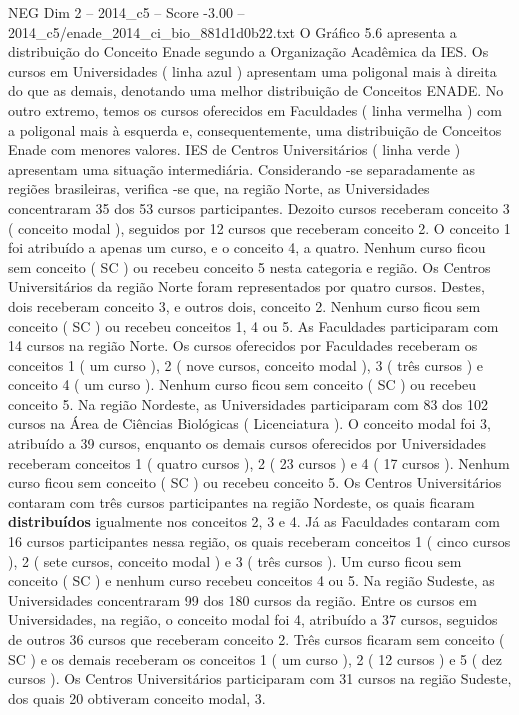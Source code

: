 \begin{textsample}{NEG Dim 2 – 2014\_c5 – Score -3.00 – 2014\_c5/enade\_2014\_ci\_bio\_881d1d0b22.txt}
O Gráfico 5.6 apresenta a distribuição do Conceito Enade segundo a Organização Acadêmica da IES.
Os cursos em Universidades ( linha azul ) apresentam uma poligonal mais à direita do que as demais, denotando uma melhor distribuição de Conceitos ENADE.
No outro extremo, temos os cursos oferecidos em Faculdades ( linha vermelha ) com a poligonal mais à esquerda e, consequentemente, uma distribuição de Conceitos Enade com menores valores.
IES de Centros Universitários ( linha verde ) apresentam uma situação intermediária.
Considerando -se separadamente as regiões brasileiras, verifica -se que, na região Norte, as Universidades concentraram 35 dos 53 cursos participantes.
Dezoito cursos receberam conceito 3 ( conceito modal ), seguidos por 12 cursos que receberam conceito 2.
O conceito 1 foi atribuído a apenas um curso, e o conceito 4, a quatro.
Nenhum curso ficou sem conceito ( SC ) ou recebeu conceito 5 nesta categoria e região.
Os Centros Universitários da região Norte foram representados por quatro cursos.
Destes, dois receberam conceito 3, e outros dois, conceito 2.
Nenhum curso ficou sem conceito ( SC ) ou recebeu conceitos 1, 4 ou 5.
As Faculdades participaram com 14 cursos na região Norte.
Os cursos oferecidos por Faculdades receberam os conceitos 1 ( um curso ), 2 ( nove cursos, conceito modal ), 3 ( três cursos ) e conceito 4 ( um curso ).
Nenhum curso ficou sem conceito ( SC ) ou recebeu conceito 5.
Na região Nordeste, as Universidades participaram com 83 dos 102 cursos na Área de Ciências Biológicas ( Licenciatura ).
O conceito modal foi 3, atribuído a 39 cursos, enquanto os demais cursos oferecidos por Universidades receberam conceitos 1 ( quatro cursos ), 2 ( 23 cursos ) e 4 ( 17 cursos ).
Nenhum curso ficou sem conceito ( SC ) ou recebeu conceito 5.
Os Centros Universitários contaram com três cursos participantes na região Nordeste, os quais ficaram \textbf{distribuídos} igualmente nos conceitos 2, 3 e 4.
Já as Faculdades contaram com 16 cursos participantes nessa região, os quais receberam conceitos 1 ( cinco cursos ), 2 ( sete cursos, conceito modal ) e 3 ( três cursos ).
Um curso ficou sem conceito ( SC ) e nenhum curso recebeu conceitos 4 ou 5.
Na região Sudeste, as Universidades concentraram 99 dos 180 cursos da região.
Entre os cursos em Universidades, na região, o conceito modal foi 4, atribuído a 37 cursos, seguidos de outros 36 cursos que receberam conceito 2.
Três cursos ficaram sem conceito ( SC ) e os demais receberam os conceitos 1 ( um curso ), 2 ( 12 cursos ) e 5 ( dez cursos ).
Os Centros Universitários participaram com 31 cursos na região Sudeste, dos quais 20 obtiveram conceito modal, 3.

\end{textsample}

